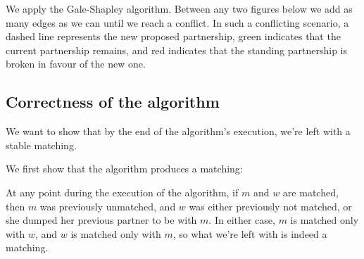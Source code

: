 \documentclass[11pt]{article}
\begin{document}
We apply the Gale-Shapley algorithm.
Between any two figures below we add as many edges as we can until we reach a conflict.
In such a conflicting scenario, a dashed line represents the new proposed partnership, green indicates that the current partnership remains, and red indicates that the standing partnership is broken in favour of the new one.

\begin{figure}[H]
\centering
\begin{subfigure}{.33\textwidth}

\end{subfigure}
\begin{subfigure}{.33\textwidth}

\end{subfigure}
\end{figure}
\begin{figure}[H]
\centering
\begin{subfigure}{.33\textwidth}

\end{subfigure}
\begin{subfigure}{.33\textwidth}

\end{subfigure}
\end{figure}
\begin{figure}[H]
\centering
\begin{subfigure}{.33\textwidth}

\end{subfigure}
\begin{subfigure}{.33\textwidth}

\end{subfigure}
\end{figure}


\subsection{Correctness of the algorithm}

We want to show that by the end of the algorithm's execution, we're left with a stable matching.
\newline

\noindent
We first show that the algorithm produces a matching:
\newline

At any point during the execution of the algorithm, if $m$ and $w$ are matched, then $m$ was previously unmatched, and $w$ was either previously not matched, or she dumped her previous partner to be with $m$.
In either case, $m$ is matched only with $w$, and $w$ is matched only with $m$, so what we're left with is indeed a matching.
\newline
\end{document}
